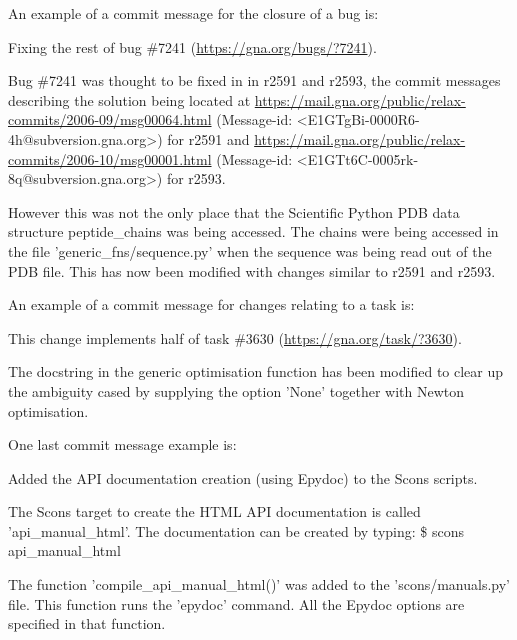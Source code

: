 An example of a commit message for the closure of a bug is:

\begin{exampleenv}
Fixing the rest of bug \#7241 (\href{https://gna.org/bugs/?7241}{https://gna.org/bugs/?7241}).

Bug \#7241 was thought to be fixed in in r2591 and r2593, the commit messages describing the solution
being located at \href{https://mail.gna.org/public/relax-commits/2006-09/msg00064.html}{https://mail.gna.org/public/relax-commits/2006-09/msg00064.html} (Message-id:
<E1GTgBi-0000R6-4h@subversion.gna.org>) for r2591 and
\href{https://mail.gna.org/public/relax-commits/2006-10/msg00001.html}{https://mail.gna.org/public/relax-commits/2006-10/msg00001.html} (Message-id:
<E1GTt6C-0005rk-8q@subversion.gna.org>) for r2593.

However this was not the only place that the Scientific Python PDB data structure peptide\_chains was
being accessed.  The chains were being accessed in the file 'generic\_fns/sequence.py' when the
sequence was being read out of the PDB file.  This has now been modified with changes similar to
r2591 and r2593.
\end{exampleenv}

An example of a commit message for changes relating to a task is:

\begin{exampleenv}
This change implements half of task \#3630 (\href{https://gna.org/task/?3630}{https://gna.org/task/?3630}).

The docstring in the generic optimisation function has been modified to clear up the ambiguity cased
by supplying the option 'None' together with Newton optimisation.
\end{exampleenv}

One last commit message example is:

\begin{exampleenv}
Added the API documentation creation (using Epydoc) to the Scons scripts.

The Scons target to create the HTML API documentation is called 'api\_manual\_html'.  The
documentation can be created by typing:
\$ scons api\_manual\_html

The function 'compile\_api\_manual\_html()' was added to the 'scons/manuals.py' file.  This function
runs the 'epydoc' command.  All the Epydoc options are specified in that function.
\end{exampleenv}



